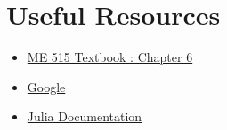 \documentclass[12pt]{article}
\begin{document}

\section{Useful Resources}
\begin{itemize}
   		\item \href{https://byu.box.com/shared/static/ywfayozbj3sr2ot6b32u8nqk5brqvurt.pdf}{ME 515 Textbook : Chapter 6}
   		\item \href{https://www.google.com/}{Google}
   		\item \href{https://docs.julialang.org/en/v1/}{Julia Documentation}
\end{itemize}
	
\end{document}
